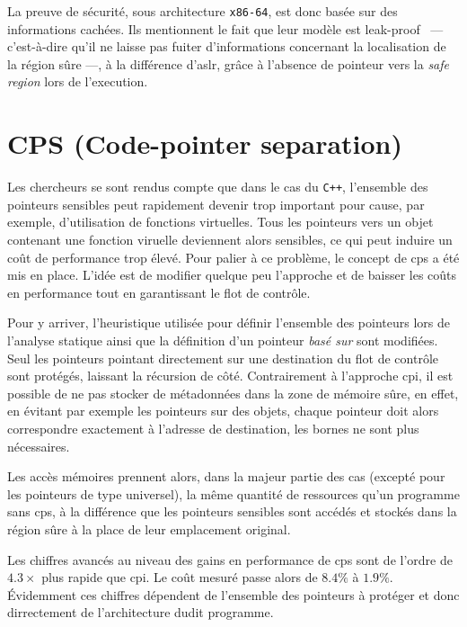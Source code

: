 La preuve de sécurité, sous architecture \texttt{x86-64}, est donc basée sur des informations cachées. Ils mentionnent le fait que leur modèle est \og leak-proof \fg \ --- c’est-à-dire qu'il ne laisse pas fuiter d'informations concernant la localisation de la région sûre ---, à la différence d'\gls{aslr}, grâce à l'absence de pointeur vers la \og \textit{safe region} \fg lors de l'execution.


\section{CPS (Code-pointer separation)}


Les chercheurs se sont rendus compte que dans le cas du \texttt{C++}, l'ensemble des pointeurs sensibles peut rapidement devenir trop important pour cause, par exemple, d'utilisation de fonctions virtuelles. Tous les pointeurs vers un objet contenant une fonction viruelle deviennent alors sensibles, ce qui peut induire un coût de performance trop élevé. Pour palier à ce problème, le concept de \og \gls{cps} \fg a été mis en place. L'idée est de modifier quelque peu l'approche et de baisser les coûts en performance tout en garantissant le flot de contrôle.

Pour y arriver, l'heuristique utilisée pour définir l'ensemble des pointeurs lors de l'analyse statique ainsi que la définition d'un pointeur \textit{basé sur} sont modifiées. Seul les pointeurs pointant directement sur une destination du flot de contrôle sont protégés, laissant la récursion de côté. Contrairement à l'approche \gls{cpi}, il est possible de ne pas stocker de métadonnées dans la zone de mémoire sûre, en effet, en évitant par exemple les pointeurs sur des objets, chaque pointeur doit alors correspondre exactement à l'adresse de destination, les bornes ne sont plus nécessaires.

Les accès mémoires prennent alors, dans la majeur partie des cas (excepté pour les pointeurs de type universel), la même quantité de ressources qu'un programme sans \gls{cps}, à la différence que les pointeurs sensibles sont accédés et stockés dans la région sûre à la place de leur emplacement original.

\newpage

Les chiffres avancés au niveau des gains en performance de \gls{cps} sont de l'ordre de $4.3\times$ plus rapide que \gls{cpi}. Le coût mesuré passe alors de $8.4\%$ à $1.9\%$. Évidemment ces chiffres dépendent de l'ensemble des pointeurs à protéger et donc dirrectement de l'architecture dudit programme.


